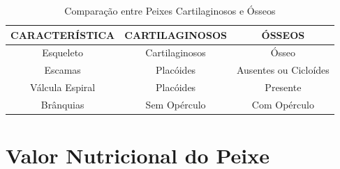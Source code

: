 \documentclass[a4paper, 11pt]{article}
\begin{document}
\begin{table}[h!]
\centering
\caption{Comparação entre Peixes Cartilaginosos e Ósseos}
\vskip 0.6cm
\begin{tabular}{c||c c}
\hline
\textbf{CARACTERÍSTICA} & \textbf{CARTILAGINOSOS} & \textbf{ÓSSEOS} \\
\hline
\hline
Esqueleto               & Cartilaginosos          & Ósseo \\
Escamas                 & Placóides               & Ausentes ou Cicloídes \\
Válcula Espiral         & Placóides               & Presente \\
Brânquias               & Sem Opérculo            & Com Opérculo \\
\hline
\end{tabular}
\end{table}

	\section{Valor Nutricional do Peixe}

\end{document}
